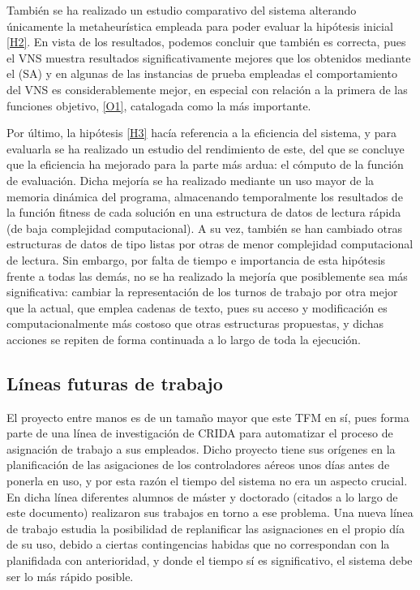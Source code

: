 También se ha realizado un estudio comparativo del sistema alterando únicamente la metaheurística empleada para poder evaluar la hipótesis inicial \ref{H2}. En vista de los resultados, podemos concluir que también es correcta, pues el VNS muestra resultados significativamente mejores que los obtenidos mediante el \sa{} (SA) y en algunas de las instancias de prueba empleadas el comportamiento del VNS es considerablemente mejor, en especial con relación a la primera de las funciones objetivo, \ref{O1}, catalogada como la más importante.

Por último, la hipótesis \ref{H3} hacía referencia a la eficiencia del sistema, y para evaluarla se ha realizado un estudio del rendimiento de este, del que se concluye que la eficiencia ha mejorado para la parte más ardua: el cómputo de la función de evaluación. Dicha mejoría se ha realizado mediante un uso mayor de la memoria dinámica del programa, almacenando temporalmente los resultados de la función fitness de cada solución en una estructura de datos de lectura rápida (de baja complejidad computacional). A su vez, también se han cambiado otras estructuras de datos de tipo listas por otras de menor complejidad computacional de lectura. Sin embargo, por falta de tiempo e importancia de esta hipótesis frente a todas las demás, no se ha realizado la mejoría que posiblemente sea más significativa: cambiar la representación de los turnos de trabajo por otra mejor que la actual, que emplea cadenas de texto, pues su acceso y modificación es computacionalmente más costoso que otras estructuras propuestas, y dichas acciones se repiten de forma continuada a lo largo de toda la ejecución.

\subsection{Líneas futuras de trabajo}
\label{sec:6:trabajo-futuro}

El proyecto entre manos es de un tamaño mayor que este TFM en sí, pues forma parte de una línea de investigación de \gls{CRIDA} para automatizar el proceso de asignación de trabajo a sus empleados. Dicho proyecto tiene sus orígenes en la planificación de las asigaciones de los controladores aéreos unos días antes de ponerla en uso, y por esta razón el tiempo del sistema no era un aspecto crucial. En dicha línea diferentes alumnos de máster y doctorado (citados a lo largo de este documento) realizaron sus trabajos en torno a ese problema. Una nueva línea de trabajo estudia la posibilidad de replanificar las asignaciones en el propio día de su uso, debido a ciertas contingencias habidas que no correspondan con la planifidada con anterioridad, y donde el tiempo sí es significativo, el sistema debe ser lo más rápido posible.
%

